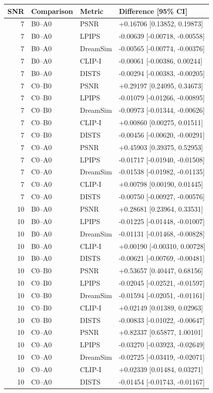 \documentclass[10pt,letterpaper]{article}
\begin{document}
\begin{longtable}{@{}rlll@{}}\toprule
SNR & Comparison & Metric & Difference [95\% CI]\\\midrule\endhead
7 & B0--A0 & PSNR & +0.16706 [0.13852, 0.19873]\\
7 & B0--A0 & LPIPS & -0.00639 [-0.00718, -0.00558]\\
7 & B0--A0 & DreamSim & -0.00565 [-0.00774, -0.00376]\\
7 & B0--A0 & CLIP-I & -0.00061 [-0.00386, 0.00244]\\
7 & B0--A0 & DISTS & -0.00294 [-0.00383, -0.00205]\\
7 & C0--B0 & PSNR & +0.29197 [0.24095, 0.34673]\\
7 & C0--B0 & LPIPS & -0.01079 [-0.01266, -0.00895]\\
7 & C0--B0 & DreamSim & -0.00973 [-0.01344, -0.00626]\\
7 & C0--B0 & CLIP-I & +0.00860 [0.00275, 0.01511]\\
7 & C0--B0 & DISTS & -0.00456 [-0.00620, -0.00291]\\
7 & C0--A0 & PSNR & +0.45903 [0.39375, 0.52953]\\
7 & C0--A0 & LPIPS & -0.01717 [-0.01940, -0.01508]\\
7 & C0--A0 & DreamSim & -0.01538 [-0.01982, -0.01135]\\
7 & C0--A0 & CLIP-I & +0.00798 [0.00190, 0.01445]\\
7 & C0--A0 & DISTS & -0.00750 [-0.00927, -0.00576]\\
10 & B0--A0 & PSNR & +0.28681 [0.23964, 0.33531]\\
10 & B0--A0 & LPIPS & -0.01225 [-0.01448, -0.01007]\\
10 & B0--A0 & DreamSim & -0.01131 [-0.01468, -0.00828]\\
10 & B0--A0 & CLIP-I & +0.00190 [-0.00310, 0.00728]\\
10 & B0--A0 & DISTS & -0.00621 [-0.00769, -0.00481]\\
10 & C0--B0 & PSNR & +0.53657 [0.40447, 0.68156]\\
10 & C0--B0 & LPIPS & -0.02045 [-0.02521, -0.01597]\\
10 & C0--B0 & DreamSim & -0.01594 [-0.02051, -0.01161]\\
10 & C0--B0 & CLIP-I & +0.02149 [0.01389, 0.02963]\\
10 & C0--B0 & DISTS & -0.00833 [-0.01022, -0.00647]\\
10 & C0--A0 & PSNR & +0.82337 [0.65877, 1.00101]\\
10 & C0--A0 & LPIPS & -0.03270 [-0.03923, -0.02649]\\
10 & C0--A0 & DreamSim & -0.02725 [-0.03419, -0.02071]\\
10 & C0--A0 & CLIP-I & +0.02339 [0.01484, 0.03271]\\
10 & C0--A0 & DISTS & -0.01454 [-0.01743, -0.01167]\\
\bottomrule\end{longtable}
\end{document}
